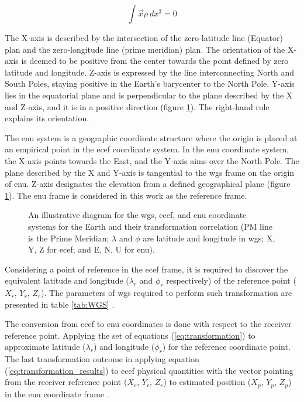 \begin{equation}
    \int \overrightarrow{x}\rho~dx^3 = 0
    \label{eq:ecef}
\end{equation}

The X-axis is described by the intersection of the zero-latitude line (Equator) plan and the zero-longitude line (prime meridian) plan. The orientation of the X-axis is deemed to be positive from the center towards the point defined by zero latitude and longitude. Z-axis is expressed by the line interconnecting North and South Poles, staying positive in the Earth's barycenter to the North Pole. Y-axis lies in the equatorial plane and is perpendicular to the plane described by the X and Z-axis, and it is in a positive direction (figure \ref{fig:ECEF}). The right-hand rule explains its orientation.

The \acrshort{enu} system is a geographic coordinate structure where the origin is placed at an empirical point in the \acrshort{ecef} coordinate system. In the \acrshort{enu} coordinate system, the X-axis points towards the East, and the Y-axis aims over the North Pole. The plane described by the X and Y-axis is tangential to the \acrshort{wgs} frame on the origin of \acrshort{enu}. Z-axis designates the elevation from a defined geographical plane (figure \ref{fig:ECEF}). The \acrshort{enu} frame is considered in this work as the reference frame.

\begin{figure}[!h]
    \centering
    \resizebox{0.70\linewidth}{!}{}
    \caption{An illustrative diagram for the \acrshort{wgs}, \acrshort{ecef}, and \acrshort{enu} coordinate systems for the Earth and their transformation correlation (PM line is the Prime Meridian; $\lambda$ and $\phi$ are latitude and longitude in \acrshort{wgs}; X, Y, Z for \acrshort{ecef}; and E, N, U for \acrshort{enu}).  }
    \label{fig:ECEF}
\end{figure}

Considering a point of reference in the \acrshort{ecef} frame, it is required to discover the equivalent latitude and longitude ($\lambda_r$ and $\phi_r$ respectively) of the reference point ($X_r$, $Y_r$, $Z_r$). The parameters of \acrshort{wgs} required to perform such transformation are presented in table \ref{tab:WGS} \cite{soler1988coordinate}.



The conversion from \acrshort{ecef} to \acrshort{enu} coordinates is done with respect to the receiver reference point. Applying the set of equations (\ref{eq:transformation}) to approximate latitude ($\lambda_r$) and longitude ($\phi_r$) for the reference coordinate point. The last transformation outcome in applying equation (\ref{eq:transformation_results}) to \acrshort{ecef} physical quantities with the vector pointing from the receiver reference point ($X_r$, $Y_r$, $Z_r$) to estimated position ($X_p$, $Y_p$, $Z_p$) in the \acrshort{enu} coordinate frame \cite{boucher2001itrs}.

